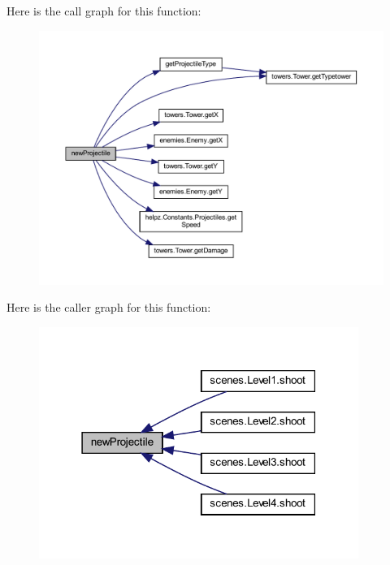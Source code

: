 Here is the call graph for this function\+:
\nopagebreak
\begin{figure}[H]
\begin{center}
\leavevmode
\includegraphics[width=350pt]{classmanagers_1_1_projectile_manager_ad4505ed80d64e9561393c0406fe7d904_cgraph}
\end{center}
\end{figure}
Here is the caller graph for this function\+:\nopagebreak
\begin{figure}[H]
\begin{center}
\leavevmode
\includegraphics[width=295pt]{classmanagers_1_1_projectile_manager_ad4505ed80d64e9561393c0406fe7d904_icgraph}
\end{center}
\end{figure}
\mbox{\label{classmanagers_1_1_projectile_manager_ac5c54df7ed3b930268c8d7752c101725}} 
